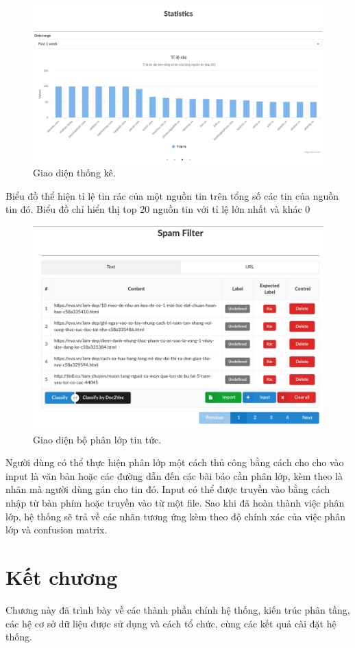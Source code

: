 \begin{figure}[H]
	\centering
  \includegraphics[width=0.96\linewidth]{Chapter3/Chapter3Figs/Chart3.png}
  \caption{Giao diện thống kê.}
	\label{fig:streamingkeywords}
\end{figure}
 Biểu đồ thể hiện tỉ lệ tin rác của một nguồn tin trên tổng số các tin của nguồn tin đó. Biểu đồ chỉ hiển thị top 20 nguồn tin với tỉ lệ lớn nhất và khác 0
\begin{figure}[H]
		\centering
	\includegraphics[width=0.96\linewidth]{Chapter3/Chapter3Figs/Filter.png}
	\caption{Giao diện bộ phân lớp tin tức.}
	\label{fig:startclustering}
\end{figure}
 Người dùng có thể thực hiện phân lớp một cách thủ công bằng cách cho cho vào input là văn bản hoặc các đường dẫn đến các bài báo cần phân lớp, kèm theo là nhãn mà người dùng gán cho tin đó. Input có thể được truyền vào bằng cách nhập từ bàn phím hoặc truyền vào từ một file. Sao khi đã hoàn thành việc phân lớp, hệ thống sẽ trả về các nhãn tương ứng kèm theo độ chính xác của việc phân lớp và confusion matrix.
\section{Kết chương}
Chương này đã trình bày về các thành phần chính hệ thống, kiến trúc phân tầng,
các hệ cơ sở dữ liệu được sử dụng và cách tổ chức, cùng các  kết quả cài đặt hệ thống.
